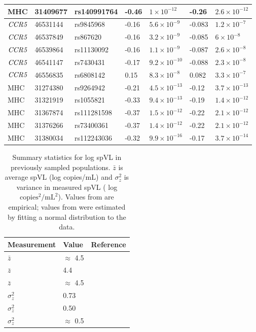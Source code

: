 \documentclass[11pt]{article}
\begin{document}
\begin{table}[ht]
\begin{tabularx}{\linewidth}{XXXXXXX}
    MHC & 31409677 & rs140991764 & -0.46 & $1 \times 10^{-12}$ & -0.26 & $2.6 \times 10^{-12}$ \\ 
    \hline
    $\emph{CCR5}$ & 46531144 & rs9845968 & -0.16 & $5.6 \times 10^{-9}$ & -0.083 & $1.2 \times 10^{-7}$ \\ 
    $\emph{CCR5}$ & 46537849 & rs867620 & -0.16 & $3.2 \times 10^{-9}$ & -0.085 & $6 \times 10^{-8}$ \\ 
    $\emph{CCR5}$ & 46539864 & rs11130092 & -0.16 & $1.1 \times 10^{-9}$ & -0.087 & $2.6 \times 10^{-8}$ \\ 
    $\emph{CCR5}$ & 46541147 & rs7430431 & -0.17 & $9.2 \times 10^{-10}$ & -0.088 & $2.3 \times 10^{-8}$ \\ 
    $\emph{CCR5}$ & 46556835 & rs6808142 & 0.15 & $8.3 \times 10^{-8}$ & 0.082 & $3.3 \times 10^{-7}$ \\ 
    MHC & 31274380 & rs9264942 & -0.21 & $4.5 \times 10^{-13}$ & -0.12 & $3.7 \times 10^{-13}$ \\ 
    MHC & 31321919 & rs1055821 & -0.33 & $9.4 \times 10^{-13}$ & -0.19 & $1.4 \times 10^{-12}$ \\ 
    MHC & 31367874 & rs111281598 & -0.37 & $1.5 \times 10^{-12}$ & -0.22 & $2.1 \times 10^{-12}$ \\ 
    MHC & 31376266 & rs73400361 & -0.37 & $1.4 \times 10^{-12}$ & -0.22 & $2.1 \times 10^{-12}$ \\ 
    MHC & 31380034 & rs112243036 & -0.32 & $9.9 \times 10^{-16}$ & -0.17 & $3.7 \times 10^{-14}$ \\ 
   \hline
\end{tabularx}
\label{tab:gwas-top-associations}
\end{table}

\begin{table}[H]
\caption{Summary statistics for log spVL in previously sampled populations. $\bar{z}$ is average spVL (log copies/mL) and $\sigma^2_z$ is variance in measured spVL ( log $\textrm{copies}^2/\textrm{mL}^2$). Values from \protect\citep{Blanquart2017, Mitov2018} are empirical; values from \protect\citep{Bonhoeffer2015} were estimated by fitting a normal distribution to the data.}
	\begin{tabularx}{\linewidth}{XXX} \hline 
	Measurement & Value & Reference \\ \hline 
	$\bar{z}$ & $\approx$ 4.5 & \citet{Mitov2018} \\
	$\bar{z}$ &  4.4 & \citet{Blanquart2017} \\
	$\bar{z}$ & $\approx$ 4.5 & \citet{Bonhoeffer2015} \\
	$\sigma^2_z$ &  0.73 &  \citet{Mitov2018} \\
	$\sigma^2_z$ &  0.50 & \citet{Blanquart2017} \\
	$\sigma^2_z$ & $\approx$ 0.5 & \citet{Bonhoeffer2015} \\ \hline 
	\end{tabularx}
	\label{tab:spVLmeasurements}
\end{table}
\end{document}
